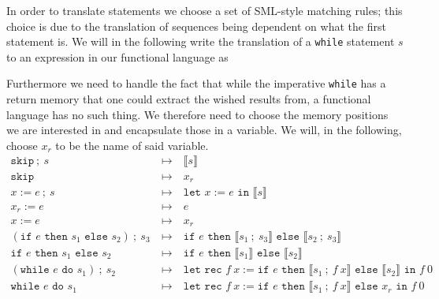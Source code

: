 \documentclass[11pt, leqno]{article}
\theoremstyle{definition}
\begin{document}
In order to translate statements we choose a set of SML-style matching rules; this
choice is due to the translation of sequences being dependent on what the first
statement is. We will in the following write the translation of a \texttt{while}
statement $s$ to an expression in our functional language as 

Furthermore we need to handle the fact that while the imperative \texttt{while} has a
return memory that one could extract the wished results from, a functional language
has no such thing. We therefore need to choose the memory positions we are interested
in and encapsulate those in a variable.
We will, in
the following, choose $x_r$ to be the name of said variable.  \\

\begin{align}
  \label{eq:transwhile}
  \texttt{skip}~;~s & ~\mapsto~ & \llbracket s \rrbracket\\
  \texttt{skip}     & ~\mapsto~ & x_r\\
  x := e~;~s        & ~\mapsto~ & \texttt{let } x := e \texttt{ in }\llbracket s \rrbracket\\
  x_r := e          & ~\mapsto~ & e \\
  x := e            & ~\mapsto~ & x_r \\
  (\texttt{if } e \texttt{ then } s_1 \texttt{ else } s_2) ~;~s_3
                    & ~\mapsto~ & \texttt{if } e
                                  \texttt{ then } \llbracket s_1 ~;~ s_3 \rrbracket
                                  \texttt{ else } \llbracket s_2 ~;~ s_3 \rrbracket \\
  \texttt{if } e \texttt{ then } s_1 \texttt{ else } s_2
                    & ~\mapsto~ & \texttt{if } e
                                  \texttt{ then } \llbracket s_1 \rrbracket
                                  \texttt{ else } \llbracket s_2 \rrbracket \\
  (\texttt{while } e \texttt{ do } s_1) ~;~ s_2
                    & ~\mapsto~ & \texttt{let rec } f~x :=
                                  \texttt{if } e
                                  \texttt{ then } \llbracket s_1 ~;~ f~x \rrbracket
                                  \texttt{ else } \llbracket s_2 \rrbracket \label{eq:while1}
                                  \texttt{ in } f~0\\
  \texttt{while } e \texttt{ do } s_1
                    & ~\mapsto~ & \texttt{let rec } f~x :=
                                  \texttt{if } e
                                  \texttt{ then } \llbracket s_1 ~;~ f~x \rrbracket
                                  \texttt{ else } x_r \label{eq:while2}
                                  \texttt{ in } f~0
\end{align}
\end{document}

